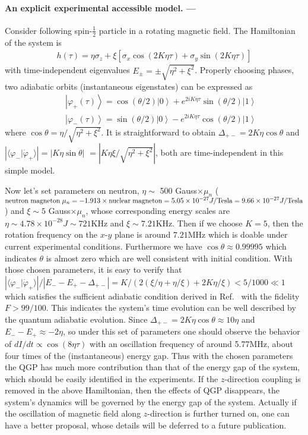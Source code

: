 \documentclass[aps,pra,twocolumn,
groupedaddress,10pt]{revtex4}
\def\bea{\begin{eqnarray}} \def\eea{\end{eqnarray}}
\begin{document}
\paragraph*{An explicit experimental accessible model. ---}
Consider following spin-$\frac{1}{2}$ particle in a rotating magnetic field. The Hamiltonian of the system is
\bea
h(\tau ) = \eta \sigma _z  + \xi \left[ {\sigma _x \cos (2K\eta \tau ) + \sigma _y \sin (2K\eta \tau )} \right]
\eea
with time-independent eigenvalues $E_\pm   = \pm \sqrt {\eta ^2  + \xi ^2 }$.
Properly choosing phases, two adiabatic orbits (instantaneous eigenstates)
can be expressed as
\bea
&&\left| {\varphi _ +  (\tau )} \right\rangle  = \cos (\theta /2)\left| 0 \right\rangle  + e^{2iK\eta \tau } \sin (\theta /2)\left| 1 \right\rangle  \\
&& \left| {\varphi _ -  (\tau )} \right\rangle  = \sin (\theta /2)\left| 0 \right\rangle  - e^{2iK\eta \tau } \cos (\theta /2)\left| 1 \right\rangle
 \eea
where $\cos \theta = \eta/\sqrt{\eta^2+\xi^2}$. It is straightforward to obtain
$\Delta_{+-} = 2 K \eta \cos \theta$ and
$| {\langle\varphi_-|\dot{\varphi}_+\rangle } | = | K \eta \sin \theta |$
$= |K \eta \xi /\sqrt{\eta^2 + \xi^2}|$, both are time-independent in this simple model.


Now let's set parameters on neutron, $\eta \sim$ 500 Gauss$\times$$\mu_n$
(${\rm{neutron\;magneton}}\;\mu_n = -1.913\times {\rm nuclear\;magneton} = 5.05
\times 10^{-27} J/{\rm Tesla} = 9.66\times 10^{-27}J/{\rm Tesla}$) and $\xi \sim 5$
Gauss$\times$$\mu_n$,
whose corresponding energy scales are $\eta\sim 4.78\times10^{-28} J \sim 721$KHz
and $\xi \sim 7.21$KHz. Then if we choose $K=5$, then the rotation frequency
on the $x$-$y$ plane is around $7.21$MHz which is doable under current experimental
conditions. Furthermore we have $\cos\theta \approx 0.99995$ which indicates
$\theta$ is almost zero which are well consistent with initial condition.
With those chosen parameters, it is easy to verify that
$| {\langle\varphi_-|\dot{\varphi}_+\rangle } |/|E_- - E_+ - \Delta_{+-}|
=  K/(2(\xi/\eta + \eta/\xi)+2K\eta/\xi) < 5/1000 \ll 1$ which satisfies
the sufficient adiabatic condition derived in Ref.~\cite{Jianda2008} with
the fidelity $F>99/100$. This indicates
the system's time evolution can be well described
by the quantum adiabatic evolution. Since
$\Delta_{+-} = 2K\eta \cos \theta \approx 10\eta $ and $E_- - E_+ \approx - 2 \eta$,
so under this set of parameters one should observe the behavior of $dI/dt \propto \cos(8\eta \tau)$
with an oscillation frequency of around 5.77MHz, about four times of the
(instantaneous) energy gap. Thus with the chosen parameters
the QGP has much more contribution than that of the energy gap of the system,
which should be easily identified in the experiments.
If the $z$-direction coupling is removed in the above
Hamiltonian, then the effects of QGP disappears,
the system's dynamics will be governed
by the energy gap of the system.
Actually if the oscillation of magnetic
field along $z$-direction is further turned on,
one can have a better proposal, whose details will be deferred
to a future publication.
\end{document}
